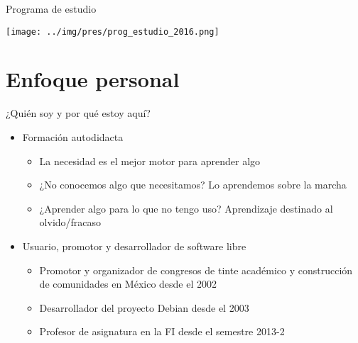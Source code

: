 \documentclass[presentation]{beamer}
\begin{document}

\begin{frame}[label={sec:org6cf3a52}]{Programa de estudio}
\begin{center}
\begin{center}
\texttt{[image: ../img/pres/prog\_estudio\_2016.png]}
\end{center}
\end{center}
\end{frame}
\section{Enfoque personal}
\label{sec:orgaac3cf5}
\begin{frame}[label={sec:org5a4a83b}]{¿Quién soy y por qué estoy aquí?}
\begin{itemize}
\item Formación autodidacta
\begin{itemize}
\item La necesidad es el mejor motor para aprender algo
\item ¿No conocemos algo que necesitamos? Lo aprendemos sobre la marcha
\item ¿Aprender algo para lo que no tengo uso? Aprendizaje destinado al
olvido/fracaso
\end{itemize}
\item Usuario, promotor y desarrollador de software libre
\begin{itemize}
\item Promotor y organizador de congresos de tinte académico y
construcción de comunidades en México desde el 2002
\item Desarrollador del proyecto Debian desde el 2003
\item Profesor de asignatura en la FI desde el semestre 2013-2
\end{itemize}
\end{itemize}
\end{frame}
\end{document}
